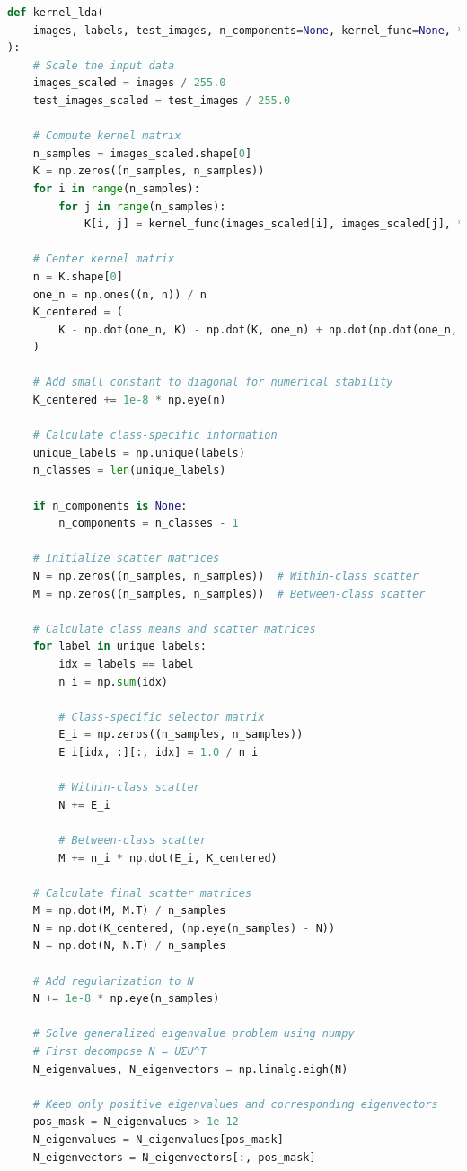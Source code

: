 \documentclass{homework}
\begin{document}
\begin{lstlisting}[language=Python]
def kernel_lda(
    images, labels, test_images, n_components=None, kernel_func=None, **kwargs
):
    # Scale the input data
    images_scaled = images / 255.0
    test_images_scaled = test_images / 255.0

    # Compute kernel matrix
    n_samples = images_scaled.shape[0]
    K = np.zeros((n_samples, n_samples))
    for i in range(n_samples):
        for j in range(n_samples):
            K[i, j] = kernel_func(images_scaled[i], images_scaled[j], **kwargs)

    # Center kernel matrix
    n = K.shape[0]
    one_n = np.ones((n, n)) / n
    K_centered = (
        K - np.dot(one_n, K) - np.dot(K, one_n) + np.dot(np.dot(one_n, K), one_n)
    )

    # Add small constant to diagonal for numerical stability
    K_centered += 1e-8 * np.eye(n)

    # Calculate class-specific information
    unique_labels = np.unique(labels)
    n_classes = len(unique_labels)

    if n_components is None:
        n_components = n_classes - 1

    # Initialize scatter matrices
    N = np.zeros((n_samples, n_samples))  # Within-class scatter
    M = np.zeros((n_samples, n_samples))  # Between-class scatter

    # Calculate class means and scatter matrices
    for label in unique_labels:
        idx = labels == label
        n_i = np.sum(idx)

        # Class-specific selector matrix
        E_i = np.zeros((n_samples, n_samples))
        E_i[idx, :][:, idx] = 1.0 / n_i

        # Within-class scatter
        N += E_i

        # Between-class scatter
        M += n_i * np.dot(E_i, K_centered)

    # Calculate final scatter matrices
    M = np.dot(M, M.T) / n_samples
    N = np.dot(K_centered, (np.eye(n_samples) - N))
    N = np.dot(N, N.T) / n_samples

    # Add regularization to N
    N += 1e-8 * np.eye(n_samples)

    # Solve generalized eigenvalue problem using numpy
    # First decompose N = UΣU^T
    N_eigenvalues, N_eigenvectors = np.linalg.eigh(N)

    # Keep only positive eigenvalues and corresponding eigenvectors
    pos_mask = N_eigenvalues > 1e-12
    N_eigenvalues = N_eigenvalues[pos_mask]
    N_eigenvectors = N_eigenvectors[:, pos_mask]


\end{lstlisting}
\end{document}
